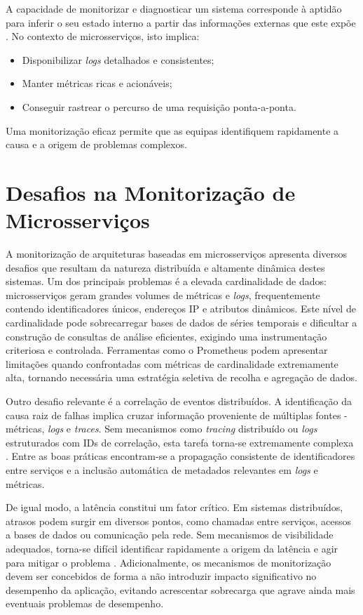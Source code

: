 A capacidade de monitorizar e diagnosticar um sistema corresponde à aptidão para inferir o seu estado interno a partir das informações externas que este expõe \cite{Kalman1960}. No contexto de microsserviços, isto implica:

\begin{itemize}
    \item Disponibilizar \textit{logs} detalhados e consistentes;
    \item Manter métricas ricas e acionáveis;
    \item Conseguir rastrear o percurso de uma requisição ponta-a-ponta.
\end{itemize}

Uma monitorização eficaz permite que as equipas identifiquem rapidamente a causa e a origem de problemas complexos.


\section{Desafios na Monitorização de Microsserviços}

A monitorização de arquiteturas baseadas em microsserviços apresenta diversos desafios que resultam da natureza distribuída e altamente dinâmica destes sistemas. Um dos principais problemas é a elevada cardinalidade de dados: microsserviços geram grandes volumes de métricas e \textit{logs}, frequentemente contendo identificadores únicos, endereços IP e atributos dinâmicos. Este nível de cardinalidade pode sobrecarregar bases de dados de séries temporais e dificultar a construção de consultas de análise eficientes, exigindo uma instrumentação criteriosa e controlada. Ferramentas como o Prometheus podem apresentar limitações quando confrontadas com métricas de cardinalidade extremamente alta, tornando necessária uma estratégia seletiva de recolha e agregação de dados.

Outro desafio relevante é a correlação de eventos distribuídos. A identificação da causa raiz de falhas implica cruzar informação proveniente de múltiplas fontes - métricas, \textit{logs} e \textit{traces}. Sem mecanismos como \textit{tracing} distribuído ou \textit{logs} estruturados com IDs de correlação, esta tarefa torna-se extremamente complexa \cite{Sigelman2010}. Entre as boas práticas encontram-se a propagação consistente de identificadores entre serviços e a inclusão automática de metadados relevantes em \textit{logs} e métricas.

De igual modo, a latência constitui um fator crítico. Em sistemas distribuídos, atrasos podem surgir em diversos pontos, como chamadas entre serviços, acessos a bases de dados ou comunicação pela rede. Sem mecanismos de visibilidade adequados, torna-se difícil identificar rapidamente a origem da latência e agir para mitigar o problema \cite{Railic2021}. Adicionalmente, os mecanismos de monitorização devem ser concebidos de forma a não introduzir impacto significativo no desempenho da aplicação, evitando acrescentar sobrecarga que agrave ainda mais eventuais problemas de desempenho.


